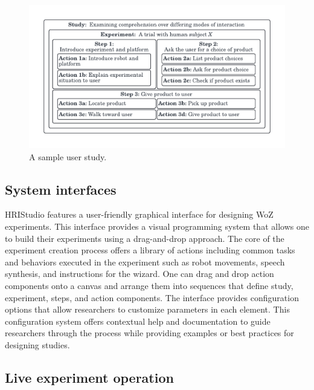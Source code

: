 \documentclass[letterpaper, 10 pt, conference]{ieeeconf}
\begin{document}
\begin{figure}[ht]
   \vskip -0.3cm
    \begin{center}
        \includegraphics[width=0.4\paperwidth]{assets/diagrams/userstudy}
        \vskip -0.5cm
        \caption{A sample user study.}
        \label{fig:userstudy}
    \end{center}
\vskip -0.7cm
\end{figure}

\subsection{System interfaces} 

HRIStudio features a user-friendly graphical interface for designing WoZ experiments. This interface provides a visual programming system that allows one to build their experiments using a drag-and-drop approach. The core of the experiment creation process offers a library of actions including common tasks and behaviors executed in the experiment such as robot movements, speech synthesis, and instructions for the wizard. One can drag and drop action components onto a canvas and arrange them into sequences that define  study, experiment, steps, and action components. The interface provides configuration options that allow researchers to customize parameters in each element. This configuration system offers contextual help and documentation to guide researchers through the process while providing examples or best practices for designing studies.

\subsection{Live experiment operation}
\end{document}
